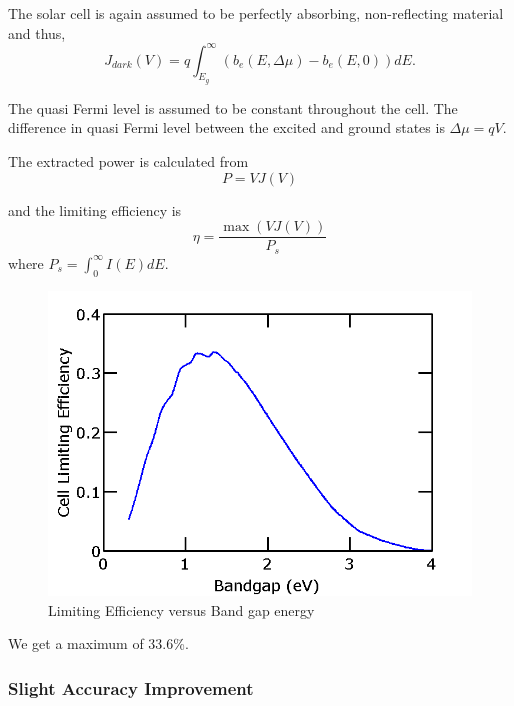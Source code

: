 \documentclass[12pt]{article}
\begin{document}
The solar cell is again assumed to be perfectly absorbing, non-reflecting material and thus,  
\begin{equation}
J_{dark}(V) = q \int_{E_g}^{\infty} (b_e (E, \Delta \mu) - b_e (E, 0)) dE.
\end{equation}

The quasi Fermi level is assumed to be constant throughout the cell.  The difference in quasi Fermi level between the excited and ground states is $\Delta \mu = q V$.


The extracted power is calculated from 
\begin{equation}
P = V J(V)
\end{equation}

and the limiting efficiency is 
\begin{equation}
\eta = \frac{\max(V J(V))}{P_s}
\end{equation}
where $P_s = \int_0^{\infty} I(E) dE$.  

\begin{figure}[H]
\centering
 \includegraphics[scale=.4]{Figures/LimitingEfficiencyVersusEnergy2}
 \caption{Limiting Efficiency versus Band gap energy}
  \label{fig:LimitingEfficiency}
\end{figure}
We get a maximum of 33.6\%.  

\subsubsection{Slight Accuracy Improvement}
\end{document}
